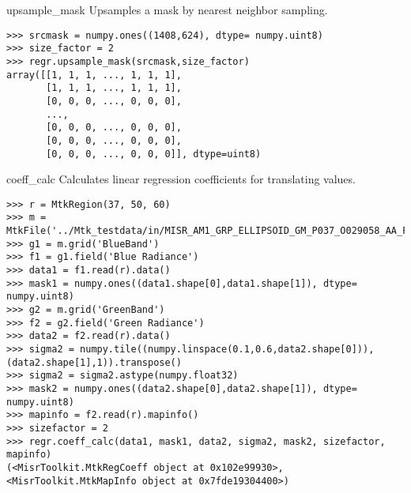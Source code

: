 \documentclass{howto}
\begin{document}
\begin{methoddesc}{upsample_mask}{}
    Upsamples a mask by nearest neighbor sampling.

\begin{verbatim}
>>> srcmask = numpy.ones((1408,624), dtype= numpy.uint8)
>>> size_factor = 2
>>> regr.upsample_mask(srcmask,size_factor)
array([[1, 1, 1, ..., 1, 1, 1],
       [1, 1, 1, ..., 1, 1, 1],
       [0, 0, 0, ..., 0, 0, 0],
       ...,
       [0, 0, 0, ..., 0, 0, 0],
       [0, 0, 0, ..., 0, 0, 0],
       [0, 0, 0, ..., 0, 0, 0]], dtype=uint8) 
\end{verbatim}
\end{methoddesc}

\begin{methoddesc}{coeff_calc}{}
    Calculates linear regression coefficients for translating values.

\begin{verbatim}
>>> r = MtkRegion(37, 50, 60)
>>> m = MtkFile('../Mtk_testdata/in/MISR_AM1_GRP_ELLIPSOID_GM_P037_O029058_AA_F03_0024.hdf')
>>> g1 = m.grid('BlueBand')
>>> f1 = g1.field('Blue Radiance')
>>> data1 = f1.read(r).data()
>>> mask1 = numpy.ones((data1.shape[0],data1.shape[1]), dtype= numpy.uint8)
>>> g2 = m.grid('GreenBand')
>>> f2 = g2.field('Green Radiance')
>>> data2 = f2.read(r).data()
>>> sigma2 = numpy.tile((numpy.linspace(0.1,0.6,data2.shape[0])), (data2.shape[1],1)).transpose()
>>> sigma2 = sigma2.astype(numpy.float32)
>>> mask2 = numpy.ones((data2.shape[0],data2.shape[1]), dtype= numpy.uint8)
>>> mapinfo = f2.read(r).mapinfo()
>>> sizefactor = 2
>>> regr.coeff_calc(data1, mask1, data2, sigma2, mask2, sizefactor, mapinfo)
(<MisrToolkit.MtkRegCoeff object at 0x102e99930>, <MisrToolkit.MtkMapInfo object at 0x7fde19304400>)
\end{verbatim}
\end{methoddesc} 
\end{document}

